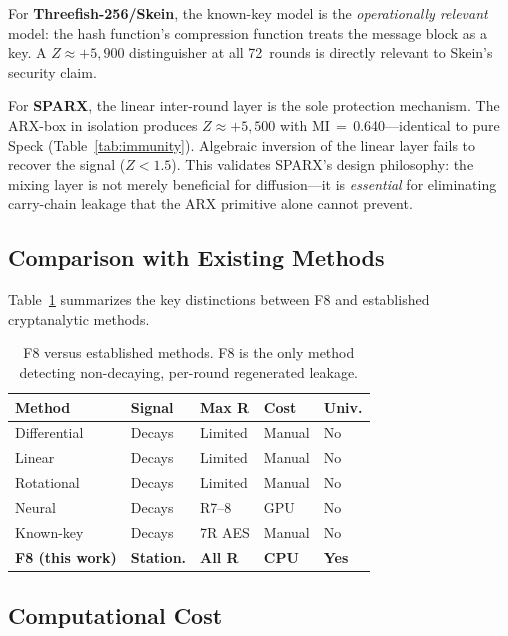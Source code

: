 \documentclass[conference,a4paper]{IEEEtran}
\begin{document}
For \textbf{Threefish-256/Skein}, the known-key model is the \emph{operationally relevant} model: the hash function's compression function treats the message block as a key. A $Z \approx +5{,}900$ distinguisher at all 72~rounds is directly relevant to Skein's security claim.

For \textbf{SPARX}, the linear inter-round layer is the sole protection mechanism. The ARX-box in isolation produces $Z \approx +5{,}500$ with MI\,$=$\,0.640---identical to pure Speck (Table~\ref{tab:immunity}). Algebraic inversion of the linear layer fails to recover the signal ($Z < 1.5$). This validates SPARX's design philosophy: the mixing layer is not merely beneficial for diffusion---it is \emph{essential} for eliminating carry-chain leakage that the ARX primitive alone cannot prevent.

\subsection{Comparison with Existing Methods}

Table~\ref{tab:prior-art} summarizes the key distinctions between F8 and established cryptanalytic methods.

\begin{table}[t]
\centering
\caption{F8 versus established methods. F8 is the only method detecting non-decaying, per-round regenerated leakage.}
\label{tab:prior-art}
\small
\begin{tabular}{@{}lllll@{}}
\toprule
\textbf{Method} & \textbf{Signal} & \textbf{Max R} & \textbf{Cost} & \textbf{Univ.} \\
\midrule
Differential~\cite{biham1991} & Decays & Limited & Manual & No \\
Linear~\cite{matsui1993} & Decays & Limited & Manual & No \\
Rotational~\cite{khovratovich2010} & Decays & Limited & Manual & No \\
Neural~\cite{gohr2019} & Decays & R7--8 & GPU & No \\
Known-key~\cite{knudsen2007} & Decays & 7R AES & Manual & No \\
\midrule
\textbf{F8 (this work)} & \textbf{Station.} & \textbf{All R} & \textbf{CPU} & \textbf{Yes} \\
\bottomrule
\end{tabular}
\end{table}

\subsection{Computational Cost}
\end{document}
